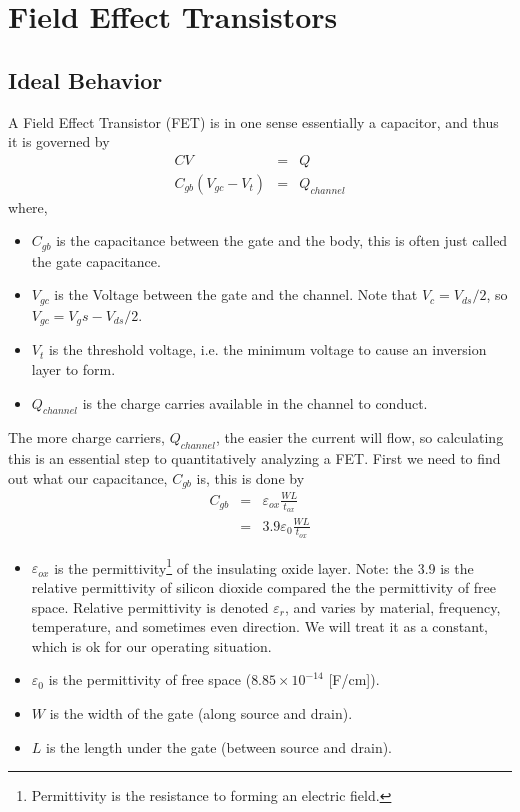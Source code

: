 \chapter{Field Effect Transistors}

\section{Ideal Behavior}

A Field Effect Transistor (FET) is in one sense essentially a capacitor, and thus it is governed by
\begin{eqnarray}
CV &=& Q\\
C_{gb}(V_{gc}-V_t) &=& Q_{channel}
\end{eqnarray}
where,
\begin{itemize}
\item $C_{gb}$ is the capacitance between the gate and the body, this is often just called the gate capacitance.
\item $V_{gc}$ is the Voltage between the gate and the channel.  Note that $V_c=V_{ds}/2$, so $V_{gc}=V_gs-V_{ds}/2$.
\item $V_t$ is the threshold voltage, i.e. the minimum voltage to cause an inversion layer to form.
\item $Q_{channel}$ is the charge carries available in the channel to conduct.
\end{itemize}
The more charge carriers, $Q_{channel}$, the easier the current will flow, so calculating this is an essential step to quantitatively analyzing a FET.  First we need to find out what our capacitance, $C_{gb}$ is, this is done by
\begin{eqnarray}
C_{gb} &=& \varepsilon_{ox}\frac{WL}{t_{ox}} \\
&=& 3.9\varepsilon_0\frac{WL}{t_{ox}}
\end{eqnarray}
\begin{itemize}
\item $\varepsilon_{ox}$ is the permittivity\footnote{Permittivity is the resistance to forming an electric field.} of the insulating oxide layer.  Note: the 3.9 is the relative permittivity of silicon dioxide compared the the permittivity of free space.  Relative permittivity is denoted $\varepsilon_r$, and varies by material, frequency, temperature, and sometimes even direction.  We will treat it as a constant, which is ok for our operating situation.
\item $\varepsilon_0$ is the permittivity of free space ($8.85 \times 10^{-14}$ [F/cm]).
\item $W$ is the width of the gate (along source and drain).
\item $L$ is the length under the gate (between source and drain).
\end{itemize}
